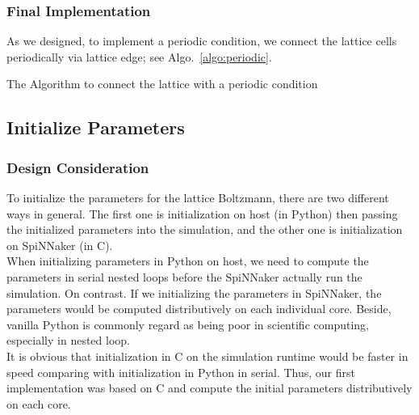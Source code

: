 \subsubsection{Final Implementation}
As we designed, to implement a periodic condition, we connect the lattice cells periodically via lattice edge; see Algo.~\ref{algo:periodic}.

\begin{algorithm}
 \caption{The Algorithm to connect the lattice with a periodic condition}
 \label{algo:periodic}

\end{algorithm}




\subsection{Initialize Parameters} \label{sec:ip}
\subsubsection{Design Consideration}
To initialize the parameters for the lattice Boltzmann, there are two different ways in general. The first one is initialization on host (in Python) then passing the initialized parameters into the simulation, and the other one is initialization on SpiNNaker (in C).\\

When initializing parameters in Python on host, we need to compute the parameters in serial nested loops before the SpiNNaker actually run the simulation. On contrast. If we initializing the parameters in SpiNNaker, the parameters would be computed distributively on each individual core. Beside, vanilla Python is commonly regard as being poor in scientific computing, especially in nested loop.\\

It is obvious that initialization in C on the simulation runtime would be faster in speed comparing with initialization in Python in serial. Thus, our first implementation was based on C and compute the initial parameters distributively on each core. \\

